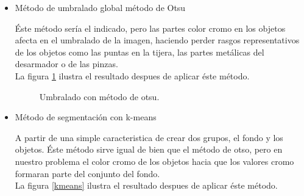 \documentclass[a4paper, 11pt]{article}
\begin{document}
\begin{itemize}
\item Método de umbralado global método de Otsu

  Éste método sería el indicado, pero las partes color cromo en los objetos afecta en el umbralado de la imagen, haciendo perder rasgos representativos de los objetos como las puntas en la tijera, las partes metálicas del desarmador o de las pinzas. \\

  La figura \ref{otsu} ilustra el resultado despues de aplicar éste método.
  
  \begin{figure}[ht]%
    \centering
    \qquad
    \caption{Umbralado con método de otsu.}%
    \label{otsu}%
\end{figure}
  
\item Método de segmentación con k-means

  A partir de una simple caracteristica de crear dos grupos, el fondo y los objetos. Éste método sirve igual de bien que el método de otso, pero en nuestro problema el color cromo de los objetos hacia que los valores cromo formaran parte del conjunto del fondo.\\

  La figura \ref{kmeans} ilustra el resultado despues de aplicar éste método.
  

\end{itemize}
\end{document}
